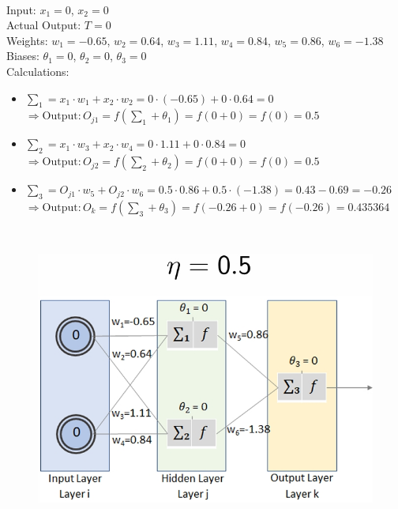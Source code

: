 \documentclass{book}
\begin{document}
\\
Input: \(x_1 = 0\), \(x_2 = 0\)\\
Actual Output: \(T = 0\)\\
Weights: \(w_1 = -0.65\), \(w_2 = 0.64\), \(w_3 = 1.11\), \(w_4 = 0.84\), \(w_5 = 0.86\), \(w_6 = -1.38\)\\
Biases: \(\theta_1 = 0\), \(\theta_2 = 0\), \(\theta_3 = 0\)\\
Calculations:\\
\begin{itemize}
    \item \(\sum_1 = x_1 \cdot w_1 + x_2 \cdot w_2 = 0 \cdot (-0.65) + 0 \cdot 0.64 = 0\)\\
    \(\Rightarrow \text{Output}: O_{j1} = f(\sum_1 + \theta_1) = f(0 + 0) = f(0) = 0.5\)
    \item \(\sum_2 = x_1 \cdot w_3 + x_2 \cdot w_4 = 0 \cdot 1.11 + 0 \cdot 0.84 = 0\)\\
    \(\Rightarrow \text{Output}: O_{j2} = f(\sum_2 + \theta_2) = f(0 + 0) = f(0) = 0.5\)
    \item \(\sum_3 = O_{j1} \cdot w_5 + O_{j2} \cdot w_6 = 0.5 \cdot 0.86 + 0.5 \cdot (-1.38) = 0.43 - 0.69 = -0.26\)\\
    \(\Rightarrow \text{Output}: O_{k} = f(\sum_3 + \theta_3) = f(-0.26 + 0) = f(-0.26) = 0.435364\)\\
\end{itemize}
\newpage
{}\\
\begin{figure}
    \includegraphics[scale=0.24]{chapter 7/ch7_figure8.jpeg}
\end{figure}
\end{document}
